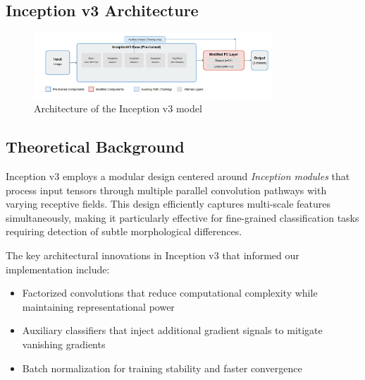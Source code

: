 \documentclass[a4paper,12pt]{report}
\begin{document}


\subsection{Inception v3 Architecture}

\begin{figure}[H]
    \centering
    \includegraphics[width=0.8\textwidth]{images/architecture/inception.png}
    \caption{Architecture of the Inception v3 model}
    \label{fig:inception_architecture}
\end{figure}

\subsection*{Theoretical Background}

Inception v3 \citep{szegedy2015rethinkinginceptionarchitecturecomputer} employs a modular design centered around \textit{Inception modules} that process input tensors through multiple parallel convolution pathways with varying receptive fields. This design efficiently captures multi-scale features simultaneously, making it particularly effective for fine-grained classification tasks requiring detection of subtle morphological differences.

The key architectural innovations in Inception v3 that informed our implementation include:
\begin{itemize}
    \item Factorized convolutions that reduce computational complexity while maintaining representational power
    \item Auxiliary classifiers that inject additional gradient signals to mitigate vanishing gradients
    \item Batch normalization for training stability and faster convergence

\end{itemize}
\end{document}
